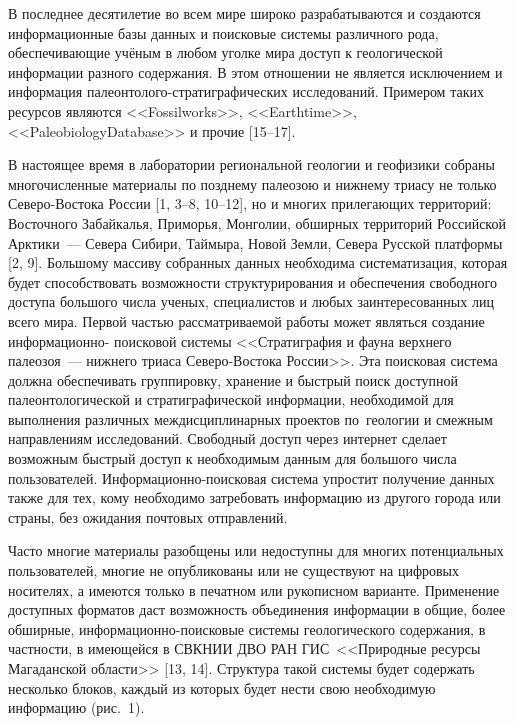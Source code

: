  

\makeProcTitle
{}

В последнее десятилетие во всем мире широко разрабатываются и создаются информационные базы данных и поисковые системы различного рода, обеспечивающие учёным в любом уголке мира доступ к геологической информации разного содержания. В этом отношении не является исключением и информация палеонтолого-стратиграфических исследований. Примером таких ресурсов являются <<Fossilworks>>, <<Earthtime>>, <<PaleobiologyDatabase>> и прочие [15--17].

В настоящее время в лаборатории региональной геологии и геофизики собраны многочисленные материалы по позднему палеозою и нижнему триасу не только Северо-Востока России [1, 3--8, 10--12], но и многих прилегающих территорий: Восточного Забайкалья, Приморья, Монголии, обширных территорий Российской Арктики~--- Севера Сибири, Таймыра, Новой Земли, Севера Русской платформы [2, 9]. Большому массиву собранных данных необходима систематизация, которая будет способствовать возможности структурирования и обеспечения свободного доступа большого числа ученых, специалистов и любых заинтересованных лиц всего мира.
Первой частью рассматриваемой работы может являться создание информационно-  поисковой системы <<Стратиграфия и фауна верхнего палеозоя~--- нижнего триаса Северо-Востока России>>. Эта поисковая система должна обеспечивать группировку, хранение и быстрый поиск доступной палеонтологической и стратиграфической информации, необходимой для выполнения различных междисциплинарных проектов по~геологии и смежным направлениям исследований. Свободный доступ через интернет сделает возможным быстрый доступ к необходимым данным для большого числа пользователей. Информационно-поисковая система упростит получение данных также для тех, кому необходимо затребовать информацию из другого города или страны, без ожидания почтовых отправлений.

Часто многие материалы разобщены или недоступны для многих потенциальных пользователей, многие не опубликованы или не существуют на цифровых носителях, а имеются только в печатном или рукописном варианте. Применение доступных форматов даст возможность объединения информации в общие, более обширные, информационно-поисковые системы геологического содержания, в частности, в имеющейся в СВКНИИ ДВО РАН ГИС~<<Природные ресурсы Магаданской области>> [13, 14].
Структура такой системы будет содержать несколько блоков, каждый из которых будет нести свою необходимую информацию (рис.~1).

